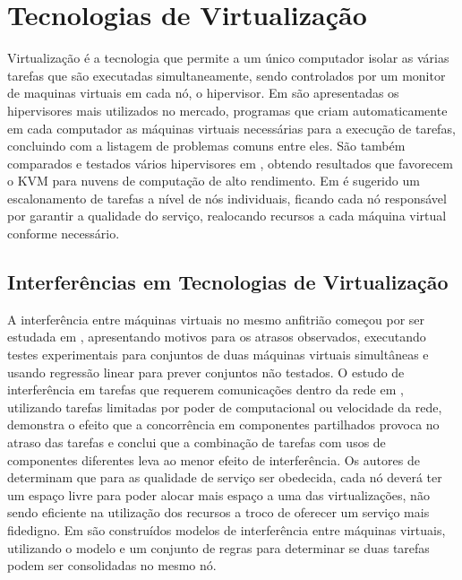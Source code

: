 

\section{Tecnologias de Virtualização}
Virtualização é a tecnologia que permite a um único computador isolar as várias tarefas que são executadas simultaneamente, sendo controlados por um monitor de maquinas virtuais em cada nó, o hipervisor. Em \cite{gu2012state} são apresentadas os hipervisores mais utilizados no mercado, programas que criam automaticamente em cada computador as máquinas virtuais necessárias para a execução de tarefas, concluindo com a listagem de problemas comuns entre eles. São também comparados e testados vários hipervisores em \cite{younge2011analysis}, obtendo resultados que favorecem o KVM para nuvens de computação de alto rendimento. 
Em \cite{cucinotta2011providing} é sugerido um escalonamento de tarefas a nível de nós individuais, ficando cada nó responsável por garantir a qualidade do serviço, realocando recursos a cada máquina virtual conforme necessário.

\subsection{Interferências em Tecnologias de Virtualização}\label{sec:interferencia} 
A interferência entre máquinas virtuais no mesmo anfitrião começou por ser estudada em \cite{koh2007analysis}, apresentando motivos para os atrasos observados, executando testes experimentais para conjuntos de duas máquinas virtuais simultâneas e usando regressão linear para prever conjuntos não testados. O estudo de interferência em tarefas que requerem comunicações dentro da rede em \cite{pu2010understanding}, utilizando tarefas limitadas por poder de computacional ou velocidade da rede, demonstra o efeito que a concorrência em componentes partilhados provoca no atraso das tarefas e conclui que a combinação de tarefas com usos de componentes diferentes leva ao menor efeito de interferência. Os autores de \cite{nathuji2010q} determinam que para as qualidade de serviço ser obedecida, cada nó deverá ter um espaço livre para poder alocar mais espaço a uma das virtualizações, não sendo eficiente na utilização dos recursos a troco de oferecer um serviço mais fidedigno. Em \cite{zhu2012performance} são construídos modelos de interferência entre máquinas virtuais, utilizando o modelo e um conjunto de regras para determinar se duas tarefas podem ser consolidadas no mesmo nó.



